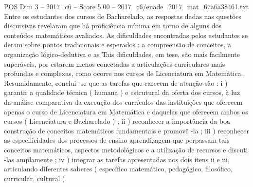 \begin{textsample}{POS Dim 3 – 2017\_c6 – Score 5.00 – 2017\_c6/enade\_2017\_mat\_67a6a38461.txt}
Entre os estudantes dos cursos de Bacharelado, as respostas dadas nas questões discursivas revelaram que há proficiência mínima em torno de alguns dos conteúdos matemáticos avaliados.
As dificuldades encontradas pelos estudantes se deram sobre pontos tradicionais e esperados : a compreensão de conceitos, a organização lógico-dedutiva e as Tais dificuldades, em tese, são mais facilmente superáveis, por estarem menos conectadas a articulações curriculares mais profundas e complexas, como ocorre nos cursos de Licenciatura em Matemática.
Resumidamente, conclui -se que as tarefas que carecem de atenção são : i ) garantir a qualidade técnica ( humana ) e estrutural da oferta dos cursos, à luz da análise comparativa da execução dos currículos das instituições que oferecem apenas o curso de Licenciatura em Matemática e daquelas que oferecem ambos os cursos ( Licenciatura e Bacharelado ) ; ii ) reconhecer a importância da boa construção de conceitos matemáticos fundamentais e promovê -la ; iii ) reconhecer as especificidades dos processos de ensino-aprendizagem que perpassam tais conceitos matemáticos, aspectos metodológicos e a utilização de recursos e discuti -las amplamente ; iv ) integrar as tarefas apresentadas nos dois itens ii e iii, articulando diferentes saberes ( específico matemático, pedagógico, filosófico, curricular, cultural ).

\end{textsample}
